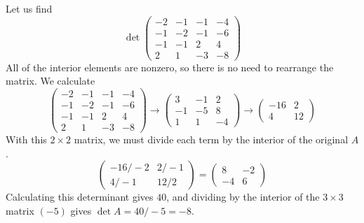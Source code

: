   \begin{example}
    Let us find
    \begin{equation}
      \det{\begin{pmatrix}
      -2&-1&-1&-4\\-1&-2&-1&-6\\-1&-1&2&4\\2&1&-3&-8
      \end{pmatrix}}
    \end{equation}
    All of the interior elements are nonzero, so there is no need to rearrange the matrix. We calculate
    \begin{equation}
      \begin{pmatrix}
      -2&-1&-1&-4\\-1&-2&-1&-6\\-1&-1&2&4\\2&1&-3&-8
      \end{pmatrix} \rightarrow \begin{pmatrix}
      3&-1&2\\-1&-5&8\\1&1&-4
      \end{pmatrix} \rightarrow \begin{pmatrix}
      -16&2\\4&12
      \end{pmatrix}
    \end{equation}
    With this $2 \times 2$ matrix, we must divide each term by the interior of the original $A$. 
    \begin{equation}
      \begin{pmatrix}
      -16/-2 & 2/-1\\4/-1 & 12/2
      \end{pmatrix} = \begin{pmatrix}
      8&-2\\-4&6
      \end{pmatrix}
    \end{equation}
    Calculating this determinant gives $40$, and dividing by the interior of the $3 \times 3$ matrix $(-5)$ gives $\det{A} = 40/-5 = -8$. 
  \end{example}

